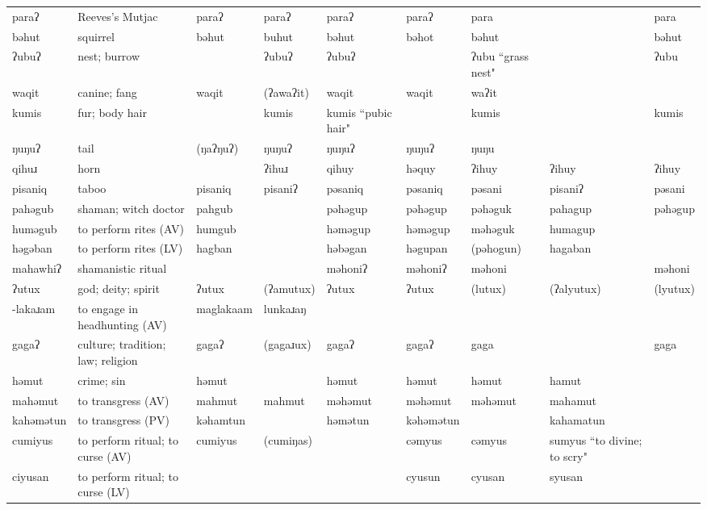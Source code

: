 \begin{landscape}
\begin{longtable}{*{9}{p{}}}
\text{*}paraʔ & Reeves's Mutjac & paraʔ & paraʔ & paraʔ & paraʔ & para &  & para\\
\text{*}bəhut & squirrel & bəhut & buhut & bəhut & bəhot & bəhut &  & bəhut\\
\text{*}ʔubuʔ & nest; burrow &  & ʔubuʔ & ʔubuʔ &  & ʔubu ``grass nest" &  & ʔubu\\
\text{*}waqit & canine; fang & waqit & (ʔawaʔit) & waqit & waqit & waʔit &  & \\
\text{*}kumis & fur; body hair &  & kumis & kumis ``pubic hair" &  & kumis &  & kumis\\
\text{*}ŋuŋuʔ & tail & (ŋaʔŋuʔ) & ŋuŋuʔ & ŋuŋuʔ & ŋuŋuʔ & ŋuŋu &  & \\
\text{*}qihuɹ & horn &  & ʔihuɹ & qihuy & həquy & ʔihuy & ʔihuy & ʔihuy\\
\text{*}pisaniq & taboo & pisaniq & pisaniʔ & pəsaniq & pəsaniq & pəsani & pisaniʔ & pəsani\\
\text{*}pahəgub & shaman; witch doctor & pahgub &  & pəhəgup & pəhəgup & pəhəguk & pahagup & pəhəgup\\
\text{*}huməgub & to perform rites (AV) & humgub &  & həməgup & həməgup & məhəguk & humagup & \\
\text{*}həgəban & to perform rites (LV) & hagban &  & həbəgan & həgupan & (pəhogun) & hagaban & \\
\text{*}mahawhiʔ & shamanistic ritual &  &  & məhoniʔ & məhoniʔ & məhoni &  & məhoni\\
\text{*}ʔutux & god; deity; spirit & ʔutux & (ʔamutux) & ʔutux & ʔutux & (lutux) & (ʔalyutux) & (lyutux)\\
\text{*}-lakaɹam & to engage in headhunting (AV) & maglakaam & lunkaɹaŋ &  &  &  &  & \\
\text{*}gagaʔ & culture; tradition; law; religion & gagaʔ & (gagaɹux) & gagaʔ & gagaʔ & gaga &  & gaga\\
\text{*}həmut & crime; sin & həmut &  & həmut & həmut & həmut & hamut & \\
\text{*}mahəmut & to transgress (AV) & mahmut & mahmut & məhəmut & məhəmut & məhəmut & mahamut & \\
\text{*}kahəmətun & to transgress (PV) & kəhamtun &  & həmətun & kəhəmətun &  & kahamatun & \\
\text{*}cumiyus & to perform ritual; to curse (AV) & cumiyus & (cumiŋas) &  & cəmyus & cəmyus & sumyus ``to divine; to scry" & \\
\text{*}ciyusan & to perform ritual; to curse (LV) &  &  &  & cyusun & cyusan & syusan & \\

\end{longtable}
\end{landscape}
